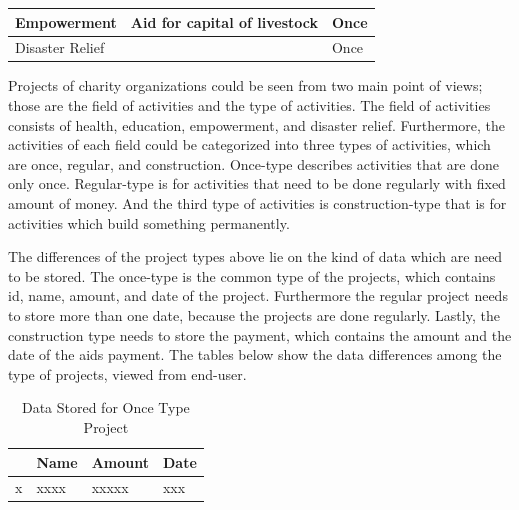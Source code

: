 \documentclass[runningheads,a4paper]{llncs}
\begin{document}
\begin{table}[]
\begin{tabular}{|l|l|l|}
		\multirow{-3}{*}{Empowerment}                                              & Aid for capital of livestock                                   & Once                                                                     \\ \hline
		\multicolumn{2}{|l|}{Disaster Relief}                                                                                                       & Once                                                                     \\ \hline
	\end{tabular}
\end{table}

Projects of charity organizations could be seen from two main point of views; those are the field of activities and the type of activities. The field of activities consists of health, education, empowerment, and disaster relief. Furthermore, the activities of each field could be categorized into three types of activities, which are once, regular, and construction. Once-type describes activities that are done only once. Regular-type is for activities that need to be done regularly with fixed amount of money. And the third type of activities is construction-type that is for activities which build something permanently.

The differences of the project types above lie on the kind of data which are need to be stored. The once-type is the common type of the projects, which contains id, name, amount, and date of the project. Furthermore the regular project needs to store more than one date, because the projects are done regularly. Lastly, the construction type needs to store the payment, which contains the amount and the date of the aids payment. The tables below show the data differences among the type of projects, viewed from end-user.

\begin{table}[]
	\centering
	\caption{Data Stored for Once Type Project}
	\label{my-label}
	\begin{tabular}{|l|l|l|l|}
		\hline
		\rowcolor[HTML]{C0C0C0} 
		\multicolumn{1}{|c|}{\cellcolor[HTML]{C0C0C0}\textbf{Id}} & \multicolumn{1}{c|}{\cellcolor[HTML]{C0C0C0}\textbf{Name}} & \multicolumn{1}{c|}{\cellcolor[HTML]{C0C0C0}\textbf{Amount}} & \multicolumn{1}{c|}{\cellcolor[HTML]{C0C0C0}\textbf{Date}} \\ \hline
		x                                                         & xxxx                                                       & xxxxx                                                        & xxx                                                        \\ \hline
	\end{tabular}
\end{table}
\end{document}
